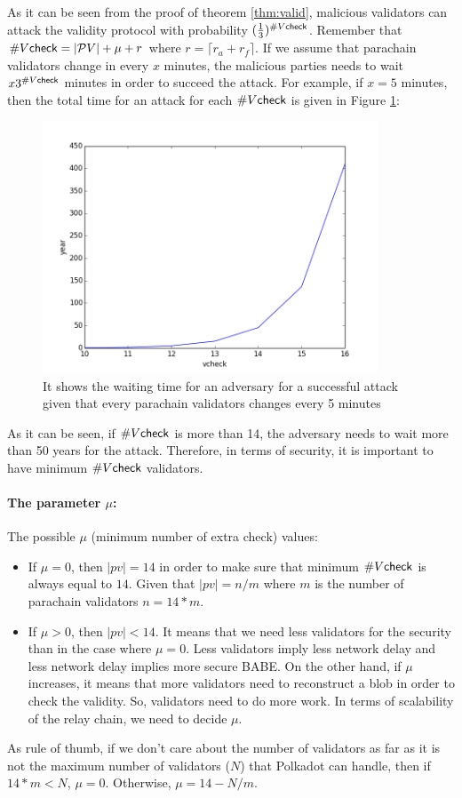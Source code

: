 As it can be seen from the proof of theorem \ref{thm:valid}, malicious validators can attack the validity protocol with probability $(\frac{1}{3})^{\#V\mathsf{check}}$. Remember that $\#V\mathsf{check} = |\mathcal{P}V| + \mu + r$ where $r = \lceil r_a + r_f \rceil$. If we assume that parachain validators change in every $x$ minutes, the malicious parties needs to wait $x3^{\#V\mathsf{check}}$ minutes in order to succeed the attack. For example, if $x = 5$ minutes, then the total time for an attack for each $\#V\mathsf{check}$ is given in Figure \ref{fig:totaltime}:


\begin{figure}[h]\centering
	  \includegraphics[width=10cm]{images/year.png}
	  \caption{It shows the waiting time for an adversary for a successful attack given that every parachain validators changes every 5 minutes}
	  \label{fig:totaltime}
\end{figure}

As it can be seen,  if $\#V\mathsf{check}$ is more than 14, the adversary needs to wait more than 50 years for the attack. Therefore, in terms of security, it is important to have  minimum $\#V\mathsf{check}$ validators.

\paragraph{The parameter $\mu$:} The possible $\mu$ (minimum number of extra check) values:

\begin{itemize}
    \item If $\mu = 0$, then $|pv| = 14$ in order to make sure that minimum $\#V\mathsf{check}$ is always equal to $14$. Given that $|pv| = n/m$ where $m$ is the number of parachain validators $n = 14 * m$. 
    
    \item If $\mu > 0$, then $|pv| < 14$. It means that we need less validators for the security than in the case where $\mu = 0$. Less validators imply less network delay and less network delay implies more secure BABE. On the other hand, if $\mu$ increases, it means that more validators need to reconstruct a blob in order to check the validity. So, validators need to do more work. In terms of scalability of the relay chain, we need to decide $\mu$. 
\end{itemize}
As rule of thumb, if we don't care about the number of validators as far as it is not the maximum  number of validators ($N$) that Polkadot can handle, then if $14 * m < N$, $\mu = 0$. Otherwise, $\mu = 14 -N/m$. 

